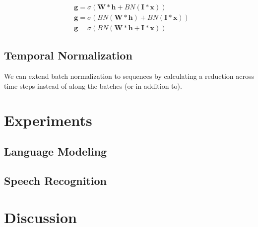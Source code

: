 \documentclass{article}
\begin{document}
\begin{equation}
\begin{split}
& \boldsymbol g = \sigma(\boldsymbol W * \boldsymbol h + BN(\boldsymbol I * \boldsymbol x)) \\
& \boldsymbol g = \sigma(BN(\boldsymbol W * \boldsymbol h) + BN(\boldsymbol I * \boldsymbol x)) \\
& \boldsymbol g = \sigma(BN(\boldsymbol W * \boldsymbol h + \boldsymbol I * \boldsymbol x)) \nonumber
\end{split}
\end{equation}

\subsection{Temporal Normalization}
We can extend batch normalization to sequences by calculating a reduction across time steps instead of along the batches (or in addition to). 

\section{Experiments}

\subsection{Language Modeling}

\subsection{Speech Recognition}

\section{Discussion}

%



\end{document}
